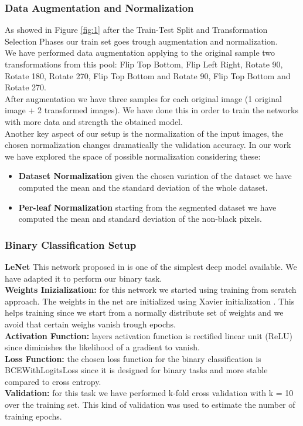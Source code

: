 \subsubsection{Data Augmentation and Normalization}
As showed in Figure \ref{fig:1} after the Train-Test Split and Transformation Selection Phases our train set goes trough augmentation and normalization.
\\\indent We have performed data augmentation applying to the original sample two transformations from this pool:
Flip Top Bottom, 	Flip Left Right, Rotate 90\degree, Rotate 180\degree, Rotate 270\degree, Flip Top Bottom and Rotate 90\degree, Flip Top Bottom and Rotate 270\degree.
\\\indent After augmentation we have three samples for each original image (1 original image + 2 transformed images).
We have done this in order to train the networks with more data and strength the obtained model.
\\\indent Another key aspect of our setup is the normalization of the input images, the chosen normalization changes dramatically the validation accuracy. In our work we have explored the space of possible normalization considering these:
	\begin{itemize}
		\item{\textbf{Dataset Normalization} given the chosen variation of the dataset we have computed the mean and the standard deviation of the whole dataset.}
		\item{\textbf{Per-leaf Normalization} starting from the segmented dataset we have computed the mean and standard deviation of the non-black pixels.}
	\end{itemize}
\subsubsection{Binary Classification Setup}

\textbf{LeNet}
This network proposed in \cite{ref30} is one of the simplest deep model available. We have adapted it to perform our binary task. \\
\textbf{Weights Inizialization:}
for this network we started using training from scratch approach. The weights in the net are initialized using Xavier initialization \cite{ref31}. This helps training  since we start from a normally distribute set of weights and we avoid that certain weighs vanish trough epochs.
\\
\textbf{Activation Function:}
layers activation function is rectified linear unit (ReLU) since diminishes the likelihood of a gradient to vanish.
\\
\textbf{Loss Function:}
the chosen loss function for the binary classification is BCEWithLogitsLoss since it is designed for binary tasks and more stable compared to cross entropy.
\\
\textbf{Validation:}
for this task we have performed k-fold cross validation with k = 10 over the training set. This kind of validation was used to estimate the number of training epochs.
